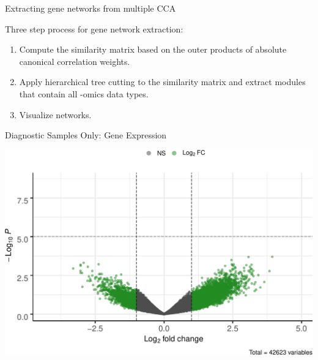 \documentclass[ignorenonframetext,]{beamer}
\begin{document}
\begin{frame}{Extracting gene networks from multiple CCA}
\protect\hypertarget{extracting-gene-networks-from-multiple-cca}{}

Three step process for gene network extraction:

\begin{enumerate}
\item
  Compute the similarity matrix based on the outer products of absolute
  canonical correlation weights.
\item
  Apply hierarchical tree cutting to the similarity matrix and extract
  modules that contain all -omics data types.
\item
  Visualize networks.
\end{enumerate}

\end{frame}

\begin{frame}{Diagnostic Samples Only: Gene Expression}
\protect\hypertarget{diagnostic-samples-only-gene-expression}{}

\includegraphics[height=0.85\textheight]{final_presentation_slides_files/figure-beamer/DRR_gene_volcano-1}

\end{frame}
\end{document}
